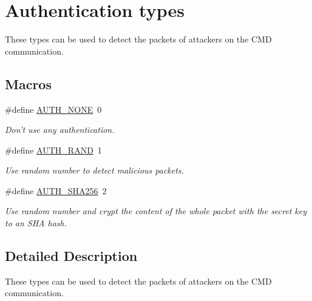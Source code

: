 \hypertarget{group___auth_types}{\section{Authentication types}
\label{group___auth_types}
}


These types can be used to detect the packets of attackers on the C\-M\-D communication.  


\subsection*{Macros}
\begin{DoxyCompactItemize}
\item 
\hypertarget{group___auth_types_gaf8aa0f05591b255db0066ae484330323}{\#define \hyperlink{group___auth_types_gaf8aa0f05591b255db0066ae484330323}{A\-U\-T\-H\-\_\-\-N\-O\-N\-E}~0}\label{group___auth_types_gaf8aa0f05591b255db0066ae484330323}

\begin{DoxyCompactList}\small\item\em Don't use any authentication. \end{DoxyCompactList}\item 
\hypertarget{group___auth_types_gaed9ef794acb1d981707b5a938e829748}{\#define \hyperlink{group___auth_types_gaed9ef794acb1d981707b5a938e829748}{A\-U\-T\-H\-\_\-\-R\-A\-N\-D}~1}\label{group___auth_types_gaed9ef794acb1d981707b5a938e829748}

\begin{DoxyCompactList}\small\item\em Use random number to detect malicious packets. \end{DoxyCompactList}\item 
\hypertarget{group___auth_types_ga9ebc47924081bb6b96183ff86abcb4be}{\#define \hyperlink{group___auth_types_ga9ebc47924081bb6b96183ff86abcb4be}{A\-U\-T\-H\-\_\-\-S\-H\-A256}~2}\label{group___auth_types_ga9ebc47924081bb6b96183ff86abcb4be}

\begin{DoxyCompactList}\small\item\em Use random number and crypt the content of the whole packet with the secret key to an S\-H\-A hash. \end{DoxyCompactList}\end{DoxyCompactItemize}


\subsection{Detailed Description}
These types can be used to detect the packets of attackers on the C\-M\-D communication. 
